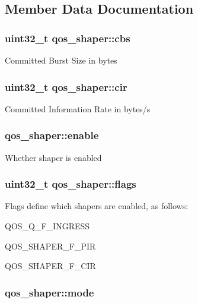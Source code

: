 \subsection{Member Data Documentation}
\hypertarget{structqos__shaper_a69e81808fcb80ba8189a672a27798bff}{
\subsubsection[{cbs}]{\setlength{\rightskip}{0pt plus 5cm}uint32\-\_\-t qos\-\_\-shaper\-::cbs}}\label{structqos__shaper_a69e81808fcb80ba8189a672a27798bff}
Committed Burst Size in bytes \hypertarget{structqos__shaper_a2c7152c0874f25897814ad448a31f5b5}{
\subsubsection[{cir}]{\setlength{\rightskip}{0pt plus 5cm}uint32\-\_\-t qos\-\_\-shaper\-::cir}}\label{structqos__shaper_a2c7152c0874f25897814ad448a31f5b5}
Committed Information Rate in bytes/s \hypertarget{structqos__shaper_ad1b7efd18e5095785a39d68be0c78526}{
\subsubsection[{enable}]{ qos\-\_\-shaper\-::enable}}\label{structqos__shaper_ad1b7efd18e5095785a39d68be0c78526}
Whether shaper is enabled \hypertarget{structqos__shaper_a02926e1c2b7380a30716b5c72b1057e1}{
\subsubsection[{flags}]{\setlength{\rightskip}{0pt plus 5cm}uint32\-\_\-t qos\-\_\-shaper\-::flags}}\label{structqos__shaper_a02926e1c2b7380a30716b5c72b1057e1}
Flags define which shapers are enabled, as follows\-:
\begin{DoxyItemize}
\item Q\-O\-S\-\_\-\-Q\-\_\-\-F\-\_\-\-I\-N\-G\-R\-E\-S\-S
\item Q\-O\-S\-\_\-\-S\-H\-A\-P\-E\-R\-\_\-\-F\-\_\-\-P\-I\-R
\item Q\-O\-S\-\_\-\-S\-H\-A\-P\-E\-R\-\_\-\-F\-\_\-\-C\-I\-R 
\end{DoxyItemize}\hypertarget{structqos__shaper_acefce05f90c1f51f5a6bf24e5524b3c2}{
\subsubsection[{mode}]{ qos\-\_\-shaper\-::mode}}\label{structqos__shaper_acefce05f90c1f51f5a6bf24e5524b3c2}
